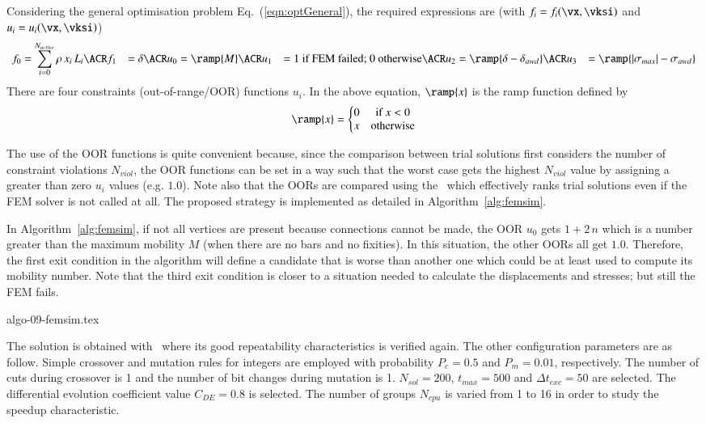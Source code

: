 \documentclass[final,5p,times,twocolumn]{elsarticle}
\newcommand{\eqname}  {Eq.}
\begin{document}
Considering the general optimisation problem \eqname~(\ref{eqn:optGeneral}), the required
expressions are (with ${f_i=f_i(\vx,\vksi)}$ and ${u_i=u_i(\vx,\vksi)}$)
\begin{align}
    f_0 &= \sum_{i=0}^{N_{active}} \rho \, x_i \, L_i \ACR
    f_1 &= \delta                                     \ACR
    u_0 &= \ramp{M}                                   \ACR
    u_1 &= \text{1 if FEM failed; 0 otherwise}        \ACR
    u_2 &= \ramp{\delta - \delta_{awd}}               \ACR
    u_3 &= \ramp{|\sigma_{max}| - \sigma_{awd}}
\end{align}
There are four constraints (out-of-range/OOR) functions $u_i$. In the above equation, $\ramp{x}$ is
the ramp function defined by
\begin{equation}
    \ramp{x} = \left\{\begin{matrix}
        0 & \text{if $x<0$} \\
        x & \text{otherwise}
    \end{matrix}\right.
\end{equation}

The use of the OOR functions is quite convenient because, since the comparison between trial
solutions first considers the number of constraint violations $N_{viol}$, the OOR functions can be
set in a way such that the worst case gets the highest $N_{viol}$ value by assigning a greater than
zero $u_i$ values (e.g. $1.0$). Note also that the OORs are compared using the
\FnParetoComparison~which effectively ranks trial solutions even if the FEM solver is not called at
all. The proposed strategy is implemented as detailed in Algorithm~\ref{alg:femsim}.

In Algorithm~\ref{alg:femsim}, if not all vertices are present because connections cannot be made,
the OOR $u_0$ gets $1+2\,n$ which is a number greater than the maximum mobility $M$ (when there are
no bars and no fixities). In this situation, the other OORs all get $1.0$. Therefore, the first exit
condition in the algorithm will define a candidate that is worse than another one which could be at
least used to compute its mobility number. Note that the third exit condition is closer to a
situation needed to calculate the displacements and stresses; but still the FEM fails.


{algo-09-femsim.tex}


The solution is obtained with \goga~where its good repeatability characteristics is verified again.
The other configuration parameters are as follow. Simple crossover and mutation rules for integers
are employed \citep{gold:89} with probability ${P_c=0.5}$ and ${P_m=0.01}$, respectively. The number
of cuts during crossover is 1 and the number of bit changes during mutation is 1. ${N_{sol}=200}$,
${t_{max}=500}$ and ${\Delta t_{exc}=50}$ are selected. The differential evolution coefficient value
$C_{DE}=0.8$ is selected. The number of groups $N_{cpu}$ is varied from 1 to 16 in order to study
the speedup characteristic.
\end{document}
